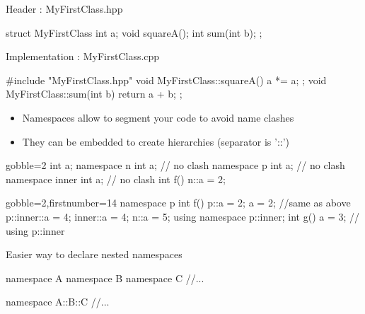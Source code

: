 \begin{frame}[fragile]
  \begin{block}{Header : MyFirstClass.hpp}
    \begin{cppcode*}{}
      struct MyFirstClass {
        int a;
        void squareA();
        int sum(int b);
      };
    \end{cppcode*}
  \end{block}
  \begin{block}{Implementation : MyFirstClass.cpp}
    \begin{cppcode*}{}
      #include "MyFirstClass.hpp"
      void MyFirstClass::squareA() {
        a *= a;
      };
      void MyFirstClass::sum(int b) {
        return a + b;
      };
    \end{cppcode*}
  \end{block}
\end{frame}

\begin{frame}[fragile]
  \begin{itemize}
  \item Namespaces allow to segment your code to avoid name clashes
  \item They can be embedded to create hierarchies (separator is '::')
  \end{itemize}
  \begin{multicols}{2}
    \begin{cppcode*}{gobble=2}
      int a;
      namespace n {
        int a;   // no clash
      }      
      namespace p {
        int a;   // no clash
        namespace inner {
          int a; // no clash
        }
      }
      int f() {
        n::a = 2;
      }
    \end{cppcode*}
    \columnbreak
    \begin{cppcode*}{gobble=2,firstnumber=14}
      namespace p {
        int f() {
          p::a = 2;
          a = 2;  //same as above
          p::inner::a = 4;
          inner::a = 4;
          n::a = 5;
        }
      }
      using namespace p::inner;
      int g() {
        a = 3; // using p::inner
      }
  \end{cppcode*}
  \end{multicols}
\end{frame}

\begin{frame}[fragile]
  Easier way to declare nested namespaces
  \begin{alertblock}{}
    \begin{cppcode*}{}
      namespace A {
        namespace B {
          namespace C {
            //...
          }
        }
      }
    \end{cppcode*}
  \end{alertblock}
  \begin{exampleblock}{}
    \begin{cppcode*}{}
      namespace A::B::C {
        //...
      }
    \end{cppcode*}    
  \end{exampleblock}
\end{frame}

